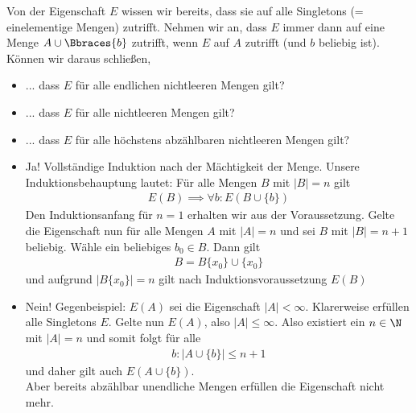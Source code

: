 
\begin{exercise}[2]

Von der Eigenschaft $E$ wissen wir bereits, dass sie auf alle Singletons (= einelementige Mengen) zutrifft.
Nehmen wir an, dass $E$ immer dann auf eine Menge $A \cup \Bbraces{b}$ zutrifft, wenn $E$ auf $A$ zutrifft (und $b$ beliebig ist).
Können wir daraus schließen,

\begin{itemize}
    \item ... dass $E$ für alle endlichen nichtleeren Mengen gilt?
    \item ... dass $E$ für alle nichtleeren Mengen gilt?
    \item ... dass $E$ für alle höchstens abzählbaren nichtleeren Mengen gilt?
\end{itemize}

\end{exercise}


\begin{solution}
\phantom{}
\begin{itemize}
    \item Ja! Vollständige Induktion nach der Mächtigkeit der Menge.
    Unsere Induktionsbehauptung lautet: Für alle Mengen $B$ mit $|B| = n$ gilt
    \begin{align*}
      E(B) \implies \forall b: E(B \cup \{b\})
    \end{align*}
    Den Induktionsanfang für $n = 1$ erhalten wir aus der Voraussetzung.
    Gelte die Eigenschaft nun für alle Mengen $A$ mit $|A| = n$ und sei $B$
    mit $|B| = n + 1$ beliebig. Wähle ein beliebiges $b_0  \in B$. Dann gilt
    \begin{align*}
      B = B\{x_0\} \cup \{x_0\}
    \end{align*}
    und aufgrund $|B\{x_0\}| = n$ gilt nach Induktionsvoraussetzung $E(B)$
    \item Nein! Gegenbeispiel: $E(A)$ sei die Eigenschaft $|A| < \infty$.
    Klarerweise erfüllen alle Singletons $E$.
    Gelte nun $E(A)$, also $|A| \leq \infty$. Also existiert ein $n \in \N$
    mit $|A| = n$ und somit folgt für alle
    \begin{align*}
      b: |A \cup \{b\}| \leq n + 1
    \end{align*} und daher gilt auch $E(A \cup \{b\})$. \\
    Aber bereits abzählbar unendliche Mengen erfüllen die Eigenschaft nicht mehr.
\end{itemize}

\end{solution}

